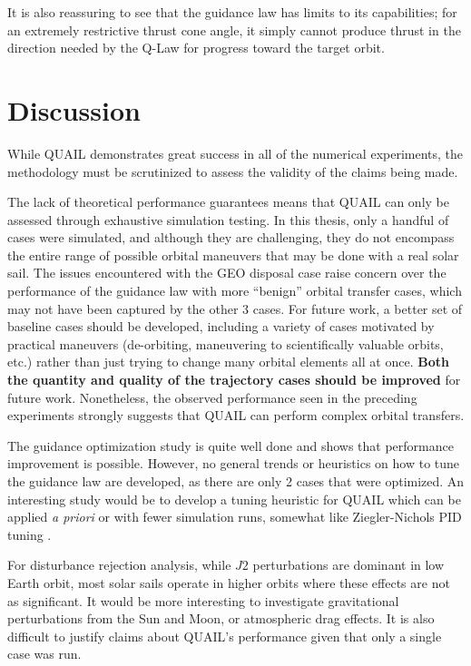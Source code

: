 It is also reassuring to see that the guidance law has limits to its capabilities; for an extremely restrictive thrust cone angle, it simply cannot produce thrust in the direction needed by the Q-Law for progress toward the target orbit.

\section{Discussion}
While QUAIL demonstrates great success in all of the numerical experiments, the methodology must be scrutinized to assess the validity of the claims being made.

The lack of theoretical performance guarantees means that QUAIL can only be assessed through exhaustive simulation testing. In this thesis, only a handful of cases were simulated, and although they are challenging, they do not encompass the entire range of possible orbital maneuvers that may be done with a real solar sail. The issues encountered with the GEO disposal case raise concern over the performance of the guidance law with more ``benign'' orbital transfer cases, which may not have been captured by the other 3 cases. For future work, a better set of baseline cases should be developed, including a variety of cases motivated by practical maneuvers (de-orbiting, maneuvering to scientifically valuable orbits, etc.) rather than just trying to change many orbital elements all at once. \textbf{Both the quantity and quality of the trajectory cases should be improved} for future work. Nonetheless, the observed performance seen in the preceding experiments strongly suggests that QUAIL can perform complex orbital transfers.

The guidance optimization study is quite well done and shows that performance improvement is possible. However, no general trends or heuristics on how to tune the guidance law are developed, as there are only 2 cases that were optimized. An interesting study would be to develop a tuning heuristic for QUAIL which can be applied \textit{a priori} or with fewer simulation runs, somewhat like Ziegler-Nichols PID tuning \cite{ziegler1942optimum}.

For disturbance rejection analysis, while \(J2\) perturbations are dominant in low Earth orbit, most solar sails operate in higher orbits where these effects are not as significant. It would be more interesting to investigate gravitational perturbations from the Sun and Moon, or atmospheric drag effects. It is also difficult to justify claims about QUAIL's performance given that only a single case was run.

